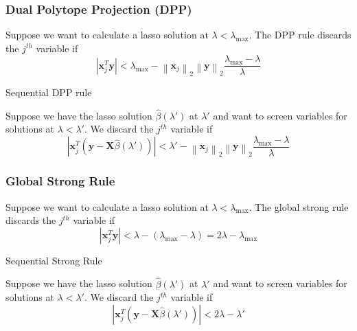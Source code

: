 \documentclass{beamer}
\newcommand{\Norm}[1]{\left\lVert#1\right\rVert}
\newcommand{\norm}[1]{\left\lvert#1\right\rvert}
\begin{document}
\begin{frame}
\frametitle{Dual Polytope Projection (DPP)}
Suppose we want to calculate a lasso solution at $\lambda<\lambda_{\max}$. The DPP rule discards the $j^{th}$ variable if 
\[\norm{\mathbf{x}_j^T\mathbf{y}}<\lambda_{\max}-\Norm{\mathbf{x}_j}_2\Norm{\mathbf{y}}_2\frac{\lambda_{\max}-\lambda}{\lambda}\]

\vspace{5pt}
{\hspace{5pt}\Large Sequential DPP rule}
\vspace{15pt}

Suppose we have the lasso solution $\hat\beta(\lambda')$ at $\lambda'$ and want to screen variables for solutions at $\lambda<\lambda'$. We discard the $j^{th}$ variable if 
\[\norm{\mathbf{x}_j^T(\mathbf{y}-\mathbf{X}\hat{\beta}(\lambda'))}<\lambda'-\Norm{\mathbf{x}_j}_2\Norm{\mathbf{y}}_2\frac{\lambda_{\max}-\lambda}{\lambda}\]
\end{frame}

\begin{frame}
\frametitle{Global Strong Rule}
Suppose we want to calculate a lasso solution at $\lambda<\lambda_{\max}$. The global strong rule discards the $j^{th}$ variable if 
\[\norm{\mathbf{x}_j^T\mathbf{y}}<\lambda-(\lambda_{\max}-\lambda)=2\lambda-\lambda_{\max}\]

\vspace{5pt}
{\hspace{5pt}\Large Sequential Strong Rule}
\vspace{15pt}

Suppose we have the lasso solution $\hat\beta(\lambda')$ at $\lambda'$ and want to screen variables for solutions at $\lambda<\lambda'$. We discard the $j^{th}$ variable if 
\[\norm{\mathbf{x}_j^T(\mathbf{y}-\mathbf{X}\hat{\beta}(\lambda'))}<2\lambda-\lambda'\]
\end{frame}
\end{document}
